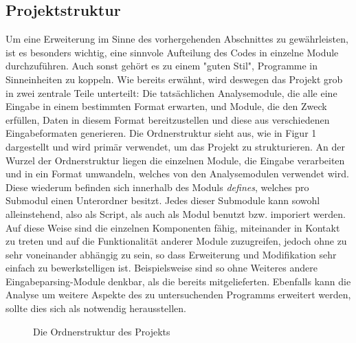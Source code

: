 \documentclass[11pt]{article} %
\begin{document}
\subsection{Projektstruktur} Um eine Erweiterung im Sinne des vorhergehenden Abschnittes zu
gewährleisten, ist es besonders wichtig, eine sinnvole Aufteilung des Codes in einzelne Module
durchzuführen. Auch sonst gehört es zu einem  "guten Stil", Programme in Sinneinheiten zu koppeln.
Wie bereits erwähnt, wird deswegen das Projekt grob in zwei zentrale Teile unterteilt: Die
tatsächlichen Analysemodule, die alle eine Eingabe in einem bestimmten Format erwarten, und Module,
die den Zweck erfüllen, Daten in diesem Format bereitzustellen und diese aus verschiedenen
Eingabeformaten generieren. Die Ordnerstruktur sieht aus, wie in Figur 1 dargestellt und wird
primär verwendet, um das Projekt zu strukturieren. An der Wurzel der Ordnerstruktur liegen die
einzelnen Module, die Eingabe verarbeiten und in ein Format umwandeln, welches von den Analysemodulen
verwendet wird. Diese wiederum befinden sich innerhalb des Moduls \textit{defines}, welches pro
Submodul einen Unterordner besitzt. Jedes dieser Submodule kann sowohl alleinstehend, also als
Script, als auch als Modul benutzt bzw. imporiert werden. Auf diese Weise sind die
einzelnen Komponenten fähig, miteinander in Kontakt zu treten und auf die Funktionalität anderer
Module zuzugreifen, jedoch ohne zu sehr voneinander abhängig zu sein, so dass Erweiterung und
Modifikation sehr einfach zu bewerkstelligen ist. Beispielsweise sind so ohne Weiteres andere
Eingabeparsing-Module denkbar, als die bereits mitgelieferten. Ebenfalls kann die Analyse um weitere
Aspekte des zu untersuchenden Programms erweitert werden, sollte dies sich als notwendig
herausstellen.
\begin{figure}[h!]
	\caption{Die Ordnerstruktur des Projekts}
\end{figure}
\end{document}
